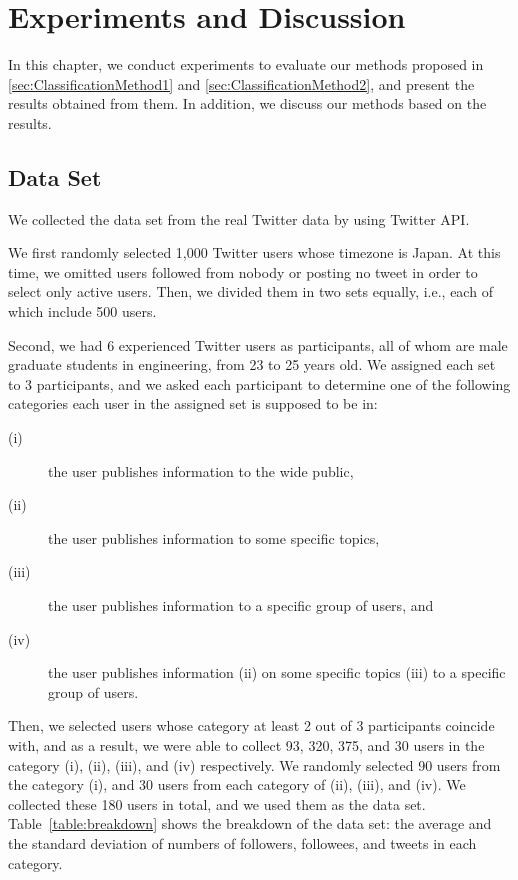 \section{Experiments and Discussion}
\label{sec:Experiment}

In this chapter, we conduct experiments to evaluate our methods proposed
in \ref{sec:ClassificationMethod1} and \ref{sec:ClassificationMethod2},
and present the results obtained from them.  In addition, we discuss our
methods based on the results.

\subsection{Data Set}
\label{subsec:Data Set}

We collected the data set from the real Twitter data by using Twitter
API.

We first randomly selected 1,000 Twitter users whose timezone is Japan.
At this time, we omitted users followed from nobody or posting
no tweet in order to select only active users.  Then, we divided them in
two sets equally, i.e., each of which include 500 users.

Second, we had 6 experienced Twitter users as participants, all of whom
are male graduate students in engineering, from 23 to 25 years old.  We
assigned each set to 3 participants, and we asked each participant to
determine one of the following categories each user in the assigned set
is supposed to be in:

\begin{description}
\item[(i)] the user publishes information to the wide public,
\item[(ii)] the user publishes information to some specific topics,
\item[(iii)] the user publishes information to a specific group of users, and
\item[(iv)] the user publishes information (ii) on some specific topics
           (iii) to a specific group of users.
\end{description}


Then, we selected users whose category at least 2 out of 3 participants
coincide with, and as a result, we were able to collect 93, 320, 375,
and 30 users in the category (i), (ii), (iii), and (iv) respectively.  We randomly
selected 90 users from the category (i), and 30 users from each category
of (ii), (iii), and (iv).  We collected these 180 users in total, and we
used them as the data set.  Table~\ref{table:breakdown} shows the
breakdown of the data set: the average and the standard deviation of numbers of
followers, followees, and tweets in each category.

